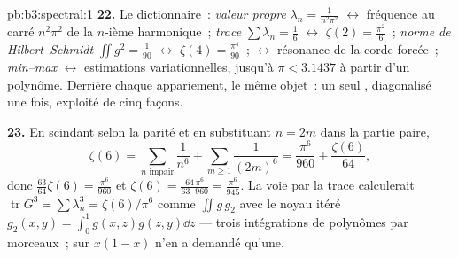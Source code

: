 \begin{solution}{pb:b3:spectral:1}
\textbf{22.} Le dictionnaire~: \emph{valeur propre}
$\lambda_n = \frac1{n^2\pi^2}$ $\leftrightarrow$ fréquence
au carré $n^2\pi^2$ de la $n$-ième harmonique~;
\emph{trace} $\sum \lambda_n = \frac16$ $\leftrightarrow$
$\zeta(2) = \frac{\pi^2}6$~; \emph{norme de
Hilbert--Schmidt} $\iint g^2 = \frac1{90}$
$\leftrightarrow$ $\zeta(4) = \frac{\pi^4}{90}$~;
\emph{} $\leftrightarrow$ résonance
de la corde forcée~; \emph{min--max} $\leftrightarrow$
estimations variationnelles, jusqu'à $\pi < 3.1437$ à
partir d'un polynôme. Derrière chaque appariement, le même
objet~: un seul  , diagonalisé
une fois, exploité de cinq façons.

\textbf{23.} En scindant selon la parité et en substituant $n
= 2m$ dans la partie paire,
\[
\zeta(6) = \sum_{n\text{ impair}}\frac1{n^6} +
\sum_{m\geq1}\frac1{(2m)^6}
= \frac{\pi^6}{960} + \frac{\zeta(6)}{64},
\]
donc $\frac{63}{64}\zeta(6) = \frac{\pi^6}{960}$ et
$\zeta(6) = \frac{64\,\pi^6}{63\cdot960} =
\frac{\pi^6}{945}$. La voie par la trace calculerait
$\operatorname{tr}G^3 = \sum\lambda_n^3 = \zeta(6)/\pi^6$
comme $\iint g\,g_2$ avec le noyau itéré $g_2(x,y) =
\int_0^1g(x,z)g(z,y)\dd z$ --- trois intégrations de
polynômes par morceaux~;  sur $x(1-x)$ n'en a
demandé qu'une.


\end{solution}
